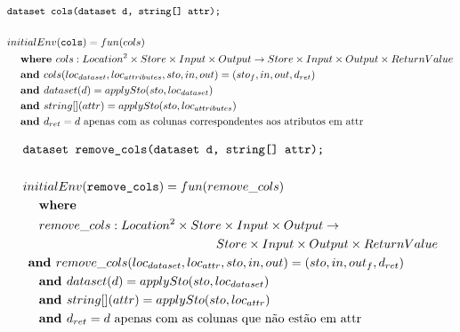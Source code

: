\documentclass[12pt]{article}
\begin{document}
\begin{align*}
	&\texttt{dataset cols(dataset d, string[] attr);} \\
	\\
&initialEnv(\texttt{cols}) = fun(cols) \\
&\hspace{3ex}\textbf{where } cols:Location^2\times Store\times Input\times Output\rightarrow Store\times Input\times Output\times ReturnValue \\
&\hspace{3ex}\textbf{and } cols(loc_{dataset}, loc_{attributes},sto,in,out) = (sto_f,in,out,d_{ret})\\
&\hspace{3ex}\textbf{and } dataset(d) = applySto(sto,loc_{dataset}) \\
&\hspace{3ex}\textbf{and } string[](attr) = applySto(sto,loc_{attributes}) \\
&\hspace{3ex}\textbf{and } d_{ret} =  d \text{ apenas com as colunas correspondentes aos atributos em attr}\\
\end{align*}

\begin{align*}
	&\texttt{dataset remove\_cols(dataset d, string[] attr);} \\
	\\
&initialEnv(\texttt{remove\_cols}) = fun(remove\_cols) \\
&\hspace{3ex}\textbf{where } \\
&\hspace{3ex} remove\_cols:Location^2\times Store\times Input\times Output\rightarrow \\
&\hspace{36ex}Store\times Input\times Output\times ReturnValue \\
&\hspace{1ex}\textbf{and } remove\_cols(loc_{dataset}, loc_{attr},sto,in,out) = (sto,in,out_f,d_{ret})\\
&\hspace{3ex}\textbf{and } dataset(d) = applySto(sto, loc_{dataset}) \\
&\hspace{3ex}\textbf{and } string[](attr) = applySto(sto, loc_{attr}) \\
&\hspace{3ex}\textbf{and } d_{ret} = d\text{ apenas com as colunas que não estão em attr} \\
\end{align*}
\end{document}
